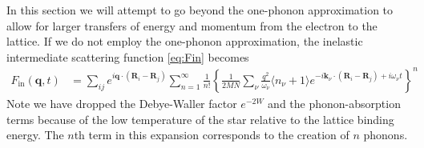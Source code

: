 \documentclass{article}
\begin{document}
In this section we will attempt to go beyond the one-phonon approximation to allow for larger transfers of energy and momentum from the electron to the lattice. If we do not employ the one-phonon approximation, the inelastic intermediate scattering function \eqref{eq:Fin} becomes
\begin{align}
  F_\text{in}(\textbf{q}, t) &= \sum_{ij} e^{i\textbf{q}\cdot(\textbf{R}_i - \textbf{R}_j)} \sum_{n = 1}^\infty \frac{1}{n!}\left\{ \frac{1}{2 MN} \sum_\nu \frac{q^2}{\omega_\nu} \langle n_\nu + 1 \rangle e^{-i \textbf{k}_\nu \cdot(\textbf{R}_i - \textbf{R}_j) + i \omega_\nu t} \right\}^n
\end{align}
Note we have dropped the Debye-Waller factor $e^{-2 W}$ and the phonon-absorption terms because of the low temperature of the star relative to the lattice binding energy. The $n$th term in this expansion corresponds to the creation of $n$ phonons.
\end{document}
